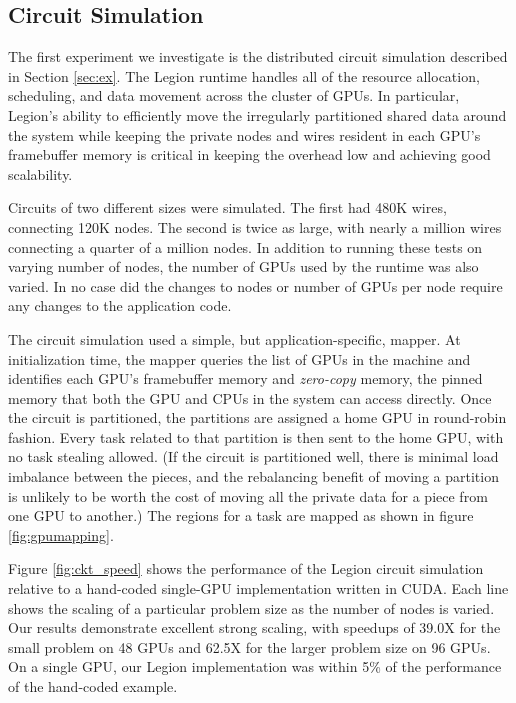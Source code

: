 \subsection{Circuit Simulation}
\label{subsec:exp_ckt}

The first experiment we investigate is the distributed circuit simulation described in 
Section \ref{sec:ex}.  The Legion runtime handles all of the resource allocation, 
scheduling, and data movement across the cluster of GPUs.  In particular,  
Legion's ability to efficiently move the irregularly partitioned
shared data around the system while keeping the private nodes and wires resident in
each GPU's framebuffer memory is critical in keeping the overhead low and achieving 
good scalability.

Circuits of two different sizes were simulated.  The first had 480K wires, connecting
120K nodes.  The second is twice as large, with nearly a million wires connecting a
quarter of a million nodes.  In addition to running these tests on varying number of
nodes, the number of GPUs used by the runtime was also varied.  In no case did the 
changes to nodes or number of GPUs per node require any changes to the application code.

The circuit simulation used a simple, but application-specific, mapper.  At initialization
time, the mapper queries the list of GPUs in the machine and identifies each GPU's
framebuffer memory and {\em zero-copy} memory, the pinned memory that both the GPU and
CPUs in the system can access directly.  Once the circuit is partitioned, the partitions
are assigned a home GPU in round-robin fashion.  Every task related to that partition is
then sent to the home GPU, with no task stealing allowed.  (If the circuit is partitioned well,
there is minimal load imbalance between the pieces, and the rebalancing benefit of 
moving a partition is unlikely to be worth the cost of moving all the 
private data for a piece from one GPU to another.)  The regions for a task are mapped as 
shown in figure \ref{fig:gpumapping}.

Figure \ref{fig:ckt_speed} shows the performance of the Legion circuit simulation relative
to a hand-coded single-GPU implementation written in CUDA.  Each line shows the scaling of
a particular problem size as the number of nodes is varied.  Our results demonstrate
excellent strong scaling, with speedups of 39.0X for the small problem on 48 GPUs and 
62.5X for the larger problem size on 96 GPUs.  On a single GPU, our Legion implementation
was within 5\% of the performance of the hand-coded example.

